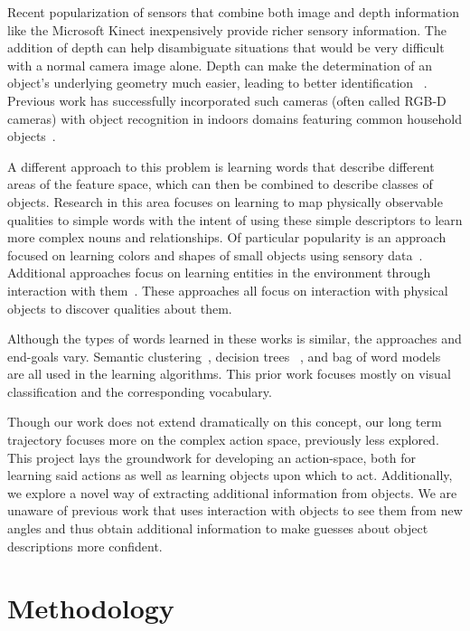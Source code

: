 \documentclass[11pt]{article}
\newcommand{\xxx}[1]{{\bf \color{red} #1}}
\begin{document}
Recent popularization of sensors that combine both image and depth information
like the Microsoft Kinect inexpensively provide richer sensory information. The
addition of depth can help disambiguate situations that would be very difficult
with a normal camera image alone. Depth can make the determination of an object’s
underlying geometry much easier, leading to better identification
~\cite{marton2010hierarchical}.
Previous work has successfully incorporated such cameras (often called RGB-D
cameras) with object recognition in indoors domains featuring common household
objects~\cite{marton2010hierarchical, lai2011sparse}.



A different approach to this problem is learning words that describe different
areas of the feature space, which can then be combined to describe classes of
objects. Research in this area focuses on learning to map physically observable
qualities to simple words with the intent of using these simple descriptors to
learn more complex nouns and relationships. Of particular popularity is an
approach focused on learning colors and shapes of small objects using sensory
data~\cite{zambuto2010visually, roy2002learning}. Additional approaches focus on
learning entities in the environment through interaction with
them~\cite{gold2009robotic}. These approaches all focus on interaction with
physical objects to discover qualities about them.

Although the types of words learned in these works is similar, the approaches and
end-goals vary. Semantic clustering~\cite{zambuto2010visually}, decision trees
~\cite{gold2009robotic}, and bag of word models~\cite{roy2002learning} are all
used in the learning algorithms. This prior work focuses mostly on visual
classification and the corresponding vocabulary.

Though our work does not extend dramatically on this concept, our long term
trajectory focuses more on the complex action space, previously less explored.
This project lays the groundwork for developing an action-space, both for
learning said actions as well as learning objects upon which to act.
Additionally, we explore a novel way of extracting additional information from
objects. We are unaware of previous work that uses interaction with objects to
see them from new angles and thus obtain additional information to make guesses
about object descriptions more confident.


\section{Methodology}
\end{document}
